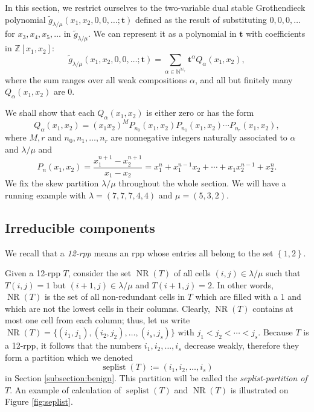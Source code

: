 \documentclass[12pt]{article}
\theoremstyle{plain}
\theoremstyle{definition}
\newcommand{\kk}{\mathbf{k}}
\let\sumnonlimits\sum
\renewcommand{\sum}{\sumnonlimits\limits}
\def\seplist{{\operatorname{seplist}}} %
\def\ceqvar{{{\alpha}}} %
\def\NS{{\operatorname{NR}}}
\def\g{{\widetilde{g}}}
\def\t{{\mathbf{t}}}
\def\lm{{\lambda/\mu}}
\def\N{{\mathbb{N}}}
\def\Z{{\mathbb{Z}}}
\begin{document}
In this section, 
we restrict ourselves to the
two-variable dual stable Grothendieck polynomial
$\g_\lm(x_1,x_2,0,0,\dots;\t)$ defined as the result of
substituting $0, 0, 0, \ldots$ for $x_3, x_4, x_5, \ldots$
in $\g_\lm$. We can represent it as a polynomial in
$\t$ with coefficients in $\Z[x_1,x_2]$:
$$\g_\lm(x_1,x_2,0,0,\dots;\t)=\sum_{\ceqvar\in \N^{\N_+}}\t^\ceqvar Q_\ceqvar(x_1,x_2),$$
where the sum ranges over all weak compositions $\alpha$,
and all but finitely many $Q_\ceqvar(x_1,x_2)$ are $0$.

We shall show that each $Q_\ceqvar(x_1,x_2)$ is either zero or has the form
\begin{equation}
\label{eq.Qalpha}
Q_\ceqvar(x_1,x_2)=(x_1x_2)^{M} P_{n_0}(x_1,x_2)P_{n_1}(x_1,x_2)\cdots P_{n_r}(x_1,x_2) , 
\end{equation}
where $M,r$ and $n_0,n_1,\dots,n_{r}$ are nonnegative integers naturally associated to $\ceqvar$ and $\lm$ and 
$$P_n(x_1,x_2)=\frac{x_1^{n+1}-x_2^{n+1}}{x_1-x_2}=x_1^{n}+x_1^{n-1}x_2+\cdots+x_1x_2^{n-1}+x_2^n.$$
We fix the skew partition $\lm$ throughout the whole section.
We will have a running example with $\lambda=(7,7,7,4,4)$ and $\mu=(5,3,2)$.


\subsection{Irreducible components}
We recall that a \textit{12-rpp} means an rpp whose entries all belong to the set $\left\{1, 2\right\}$. 

Given a 12-rpp $T$, consider the set $\NS(T)$ of all cells $(i,j)\in \lm$ such that $T(i,j)=1$ but $(i+1,j) \in \lm$ and $T(i+1,j)=2$. In other words, $\NS(T)$ is the set of all non-redundant cells in $T$ which are filled with a $1$ and which are not the lowest cells in their columns.
Clearly, $\NS(T)$ contains at most one cell from each column; thus, let us write $\NS(T)=\{(i_1,j_1),(i_2,j_2),\dots,(i_s,j_s)\}$ with $j_1<j_2<\cdots<j_s$. Because $T$ is a 12-rpp, it follows that the numbers $i_1,i_2,\dots,i_s$ decrease weakly, therefore they form a partition which we
denoted 
$$\seplist(T):=(i_1,i_2,\dots,i_s)$$ 
in Section \ref{subsection:benign}. This partition
will be called the \textit{seplist-partition of $T$}.
An example of calculation of $\seplist(T)$ and $\NS(T)$ is illustrated on Figure \ref{fig:seplist}. 
\end{document}
